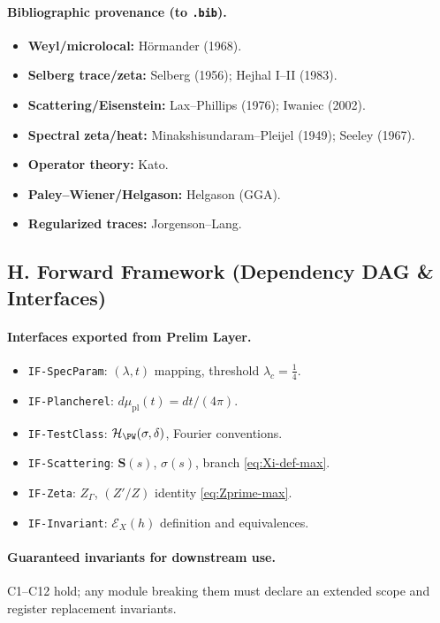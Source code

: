 \paragraph{Bibliographic provenance (to \texttt{.bib}).}
\begin{itemize}
  \item \textbf{Weyl/microlocal:} Hörmander (1968).
  \item \textbf{Selberg trace/zeta:} Selberg (1956); Hejhal I–II (1983).
  \item \textbf{Scattering/Eisenstein:} Lax–Phillips (1976); Iwaniec (2002).
  \item \textbf{Spectral zeta/heat:} Minakshisundaram–Pleijel (1949); Seeley (1967).
  \item \textbf{Operator theory:} Kato.
  \item \textbf{Paley–Wiener/Helgason:} Helgason (GGA).
  \item \textbf{Regularized traces:} Jorgenson–Lang.
\end{itemize}


\subsection*{H. Forward Framework (Dependency DAG \& Interfaces)}
\label{subsec:forward-framework-max}

\paragraph{Interfaces exported from Prelim Layer.}
\begin{itemize}
  \item \texttt{IF-SpecParam}: $(\lambda,t)$ mapping, threshold $\lambda_c=\tfrac14$.
  \item \texttt{IF-Plancherel}: $d\mu_{\mathrm{pl}}(t)=dt/(4\pi)$.
  \item \texttt{IF-TestClass}: $\mathcal H_{\PW}(\sigma,\delta)$, Fourier conventions.
  \item \texttt{IF-Scattering}: $\mathbf S(s)$, $\sigma(s)$, branch \eqref{eq:Xi-def-max}.
  \item \texttt{IF-Zeta}: $Z_\Gamma$, $(Z'/Z)$ identity \eqref{eq:Zprime-max}.
  \item \texttt{IF-Invariant}: $\mathcal E_X(h)$ definition and equivalences.
\end{itemize}

\paragraph{Guaranteed invariants for downstream use.}
C1–C12 hold; any module breaking them must declare an extended scope and register replacement invariants.

